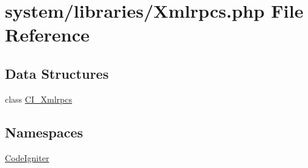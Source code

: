 \hypertarget{_xmlrpcs_8php}{\section{system/libraries/\-Xmlrpcs.php File Reference}
\label{_xmlrpcs_8php}
}
\subsection*{Data Structures}
\begin{DoxyCompactItemize}
\item 
class \hyperlink{class_c_i___xmlrpcs}{C\-I\-\_\-\-Xmlrpcs}
\end{DoxyCompactItemize}
\subsection*{Namespaces}
\begin{DoxyCompactItemize}
\item 
\hyperlink{namespace_code_igniter}{Code\-Igniter}
\end{DoxyCompactItemize}
